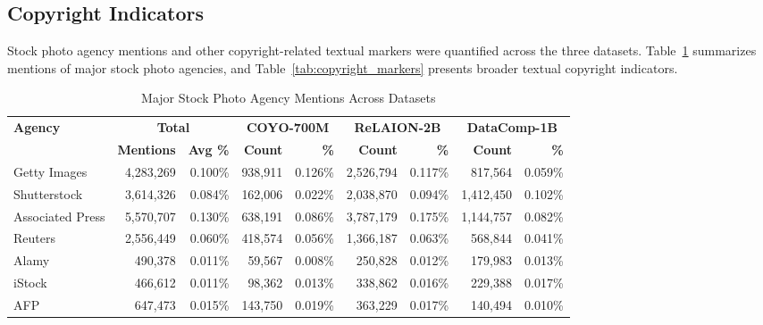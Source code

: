 \documentclass[11pt]{article}
\begin{document}
\subsection{Copyright Indicators}

Stock photo agency mentions and other copyright-related textual markers were quantified across the three datasets. Table~\ref{tab:stock_agencies} summarizes mentions of major stock photo agencies, and Table~\ref{tab:copyright_markers} presents broader textual copyright indicators.
\begin{table}[htbp]
\centering
\caption{Major Stock Photo Agency Mentions Across Datasets}
\label{tab:stock_agencies}
\begin{tabular}{l r r  r r  r r  r r}
\toprule
\textbf{Agency} & \multicolumn{2}{c}{\textbf{Total}} & \multicolumn{2}{c}{\textbf{COYO-700M}} & \multicolumn{2}{c}{\textbf{ReLAION-2B}} & \multicolumn{2}{c}{\textbf{DataComp-1B}} \\
& \textbf{Mentions} & \textbf{Avg \%} & \textbf{Count} & \textbf{\%} & \textbf{Count} & \textbf{\%} & \textbf{Count} & \textbf{\%} \\
\midrule
Getty Images     & 4,283,269 & 0.100\% & 938,911   & 0.126\% & 2,526,794 & 0.117\% & 817,564   & 0.059\% \\
Shutterstock     & 3,614,326 & 0.084\% & 162,006   & 0.022\% & 2,038,870 & 0.094\% & 1,412,450 & 0.102\% \\
Associated Press & 5,570,707 & 0.130\% & 638,191   & 0.086\% & 3,787,179 & 0.175\% & 1,144,757 & 0.082\% \\
Reuters          & 2,556,449 & 0.060\% & 418,574   & 0.056\% & 1,366,187 & 0.063\% & 568,844   & 0.041\% \\
Alamy            & 490,378   & 0.011\% & 59,567    & 0.008\% & 250,828   & 0.012\% & 179,983   & 0.013\% \\
iStock           & 466,612   & 0.011\% & 98,362    & 0.013\% & 338,862   & 0.016\% & 229,388   & 0.017\% \\
AFP              & 647,473   & 0.015\% & 143,750   & 0.019\% & 363,229   & 0.017\% & 140,494   & 0.010\% \\
\bottomrule
\end{tabular}
\end{table}
\end{document}

